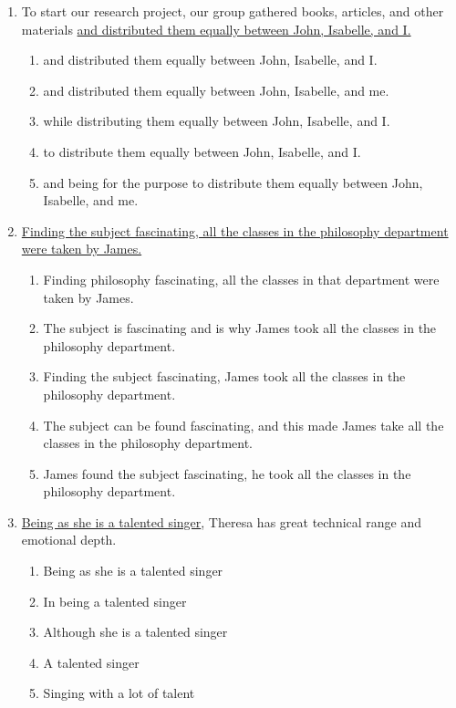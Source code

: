 \documentclass[12pt]{book}
\begin{document}
\begin{enumerate}
\bigskip
\item To start our research project, our group gathered books, articles, and other materials \ul{and distributed them equally between John, Isabelle, and I.}

\begin{enumerate}[label=(\Alph*)]
\item and distributed them equally between John, Isabelle, and I.
\item and distributed them equally between John, Isabelle, and me.
\item while distributing them equally between John, Isabelle, and I.
\item to distribute them equally between John, Isabelle, and I.
\item and being for the purpose to distribute them equally between John, Isabelle, and me.
\end{enumerate}

\bigskip
\item \ul{Finding the subject fascinating, all the classes in the philosophy department were taken by James.}
\begin{enumerate}[label=(\Alph*)]
\item Finding philosophy fascinating, all the classes in that department were taken by James.
\item The subject is fascinating and is why James took all the classes in the philosophy department.
\item Finding the subject fascinating, James took all the classes in the philosophy department.
\item The subject can be found fascinating, and this made James take all the classes in the philosophy department.
\item James found the subject fascinating, he took all the classes in the philosophy department.
\end{enumerate}

\newpage
\item \underline{Being as she is a talented singer}, Theresa has great technical range and emotional depth.

\begin{enumerate}[label=(\Alph*)]
\item Being as she is a talented singer
\item In being a talented singer
\item Although she is a talented singer
\item A talented singer
\item Singing with a lot of talent
\end{enumerate}


\end{enumerate}
\end{document}
